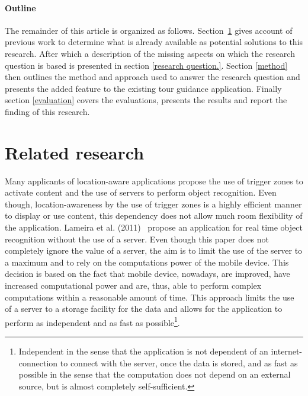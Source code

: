 \documentclass[12pt ]{article}
\begin{document}
\paragraph{Outline}
The remainder of this article is organized as follows.
Section~\ref{relatedresearch} gives account of previous work to determine what is already available as potential solutions to this research. After which a description of the missing aspects on which the research question is based is presented in section \ref{research question.}. Section \ref{method} then outlines the method and approach used to answer the research question and presents the added feature to the existing tour guidance application. Finally section \ref{evaluation} covers the evaluations, presents the results and report the finding of this research.%

\section{Related research}\label{relatedresearch}
Many applicants of location-aware applications propose the use of trigger zones to activate content and the use of servers to perform object recognition. Even though, location-awareness by the use of trigger zones is a highly efficient manner to display or use content, this dependency does not allow much room flexibility of the application.
Lameira et al. (2011)~\cite{Lameira:2011:ROR:2037373.2037485} propose an application for real time object recognition without the use
of a server. Even though this paper does not completely ignore the value of a server, the aim
is to limit the use of the server to a maximum and to rely on the computations power of the
mobile device. This decision is based on the fact that mobile device, nowadays, are improved,
have increased computational power and are, thus, able to perform complex computations
within a reasonable amount of time. This approach limits the use of a server to a storage
facility for the data and allows for the application to perform as independent and as fast as
possible\footnote{Independent in the sense that the application is not dependent of an internet-connection to connect with the server, once the data is stored, and as fast as possible in the sense that the
computation does not depend on an external source, but is almost completely self-sufficient.}.
\end{document}
